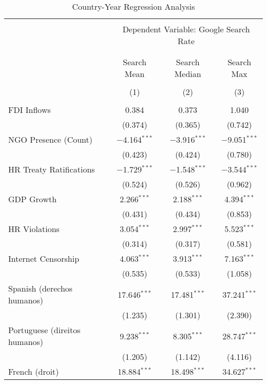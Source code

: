 
\begin{table}[!htbp] \centering 
  \caption{Country-Year Regression Analysis} 
  \label{} 
\begin{tabular}{@{\extracolsep{5pt}}lccc} 
\\[-1.8ex]\hline 
\hline \\[-1.8ex] 
 & \multicolumn{3}{c}{Dependent Variable: Google Search Rate} \\ 
\cline{2-4} 
\\[-1.8ex] & \multicolumn{3}{c}{ } \\ 
 & Search Mean & Search Median & Search Max \\ 
\\[-1.8ex] & (1) & (2) & (3)\\ 
\hline \\[-1.8ex] 
 FDI Inflows & 0.384 & 0.373 & 1.040 \\ 
  & (0.374) & (0.365) & (0.742) \\ 
  NGO Presence (Count) & $-$4.164$^{***}$ & $-$3.916$^{***}$ & $-$9.051$^{***}$ \\ 
  & (0.423) & (0.424) & (0.780) \\ 
  HR Treaty Ratifications & $-$1.729$^{***}$ & $-$1.548$^{***}$ & $-$3.544$^{***}$ \\ 
  & (0.524) & (0.526) & (0.962) \\ 
  GDP Growth & 2.266$^{***}$ & 2.188$^{***}$ & 4.394$^{***}$ \\ 
  & (0.431) & (0.434) & (0.853) \\ 
  HR Violations & 3.054$^{***}$ & 2.997$^{***}$ & 5.523$^{***}$ \\ 
  & (0.314) & (0.317) & (0.581) \\ 
  Internet Censorship & 4.063$^{***}$ & 3.913$^{***}$ & 7.163$^{***}$ \\ 
  & (0.535) & (0.533) & (1.058) \\ 
  Spanish (derechos humanos) & 17.646$^{***}$ & 17.481$^{***}$ & 37.241$^{***}$ \\ 
  & (1.235) & (1.301) & (2.390) \\ 
  Portuguese (direitos humanos) & 9.238$^{***}$ & 8.305$^{***}$ & 28.747$^{***}$ \\ 
  & (1.205) & (1.142) & (4.116) \\ 
  French (droit) & 18.884$^{***}$ & 18.498$^{***}$ & 34.627$^{***}$ \\ 

\end{tabular}
\end{table}
